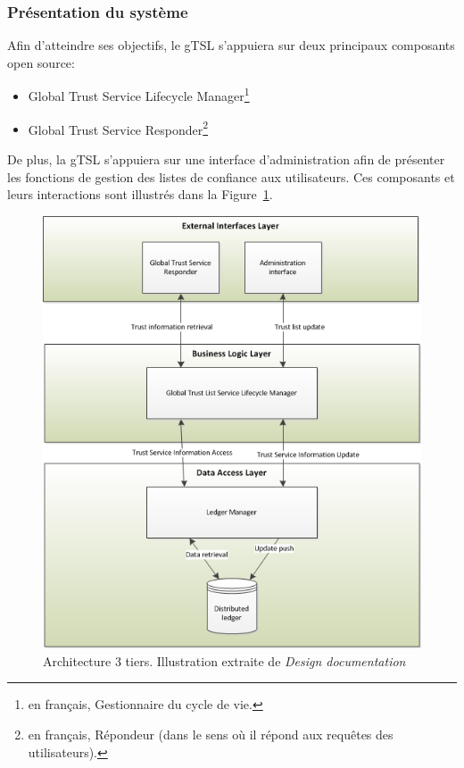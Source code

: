 \documentclass{tnreport}
\begin{document}
\subsubsection{Présentation du système}

Afin d'atteindre ses objectifs, le gTSL s'appuiera sur deux principaux composants open source:
\begin{itemize}
	\item Global Trust Service Lifecycle Manager\footnote{en français, Gestionnaire du cycle de vie.}
	\item Global Trust Service Responder\footnote{en français, Répondeur (dans le sens où il répond aux requêtes des utilisateurs).}
\end{itemize}
De plus, la gTSL s'appuiera sur une interface d'administration afin de présenter les fonctions de gestion des listes de confiance aux utilisateurs.
Ces composants et leurs interactions sont illustrés dans la Figure~\ref{fig:3tier-archi}.

\begin{figure}[h]
	\centering
	\includegraphics[scale=0.78]{figures/gTSL-3Tier}
	\caption{Architecture 3 tiers. Illustration extraite de \textit{Design documentation}~\cite{design-document}}
	\label{fig:3tier-archi}
\end{figure}
\end{document}
